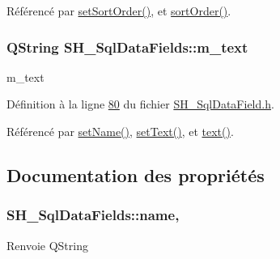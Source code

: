 Référencé par \hyperlink{classSH__SqlDataFields_a32a7c040a081d39594245e1a4a68f70d}{set\-Sort\-Order()}, et \hyperlink{classSH__SqlDataFields_af7ecc3a493545e81e6959d778352d9ac}{sort\-Order()}.

\hypertarget{classSH__SqlDataFields_a55352d3aea0863fcab26c948babe8523}{
\subsubsection[{m\-\_\-text}]{\setlength{\rightskip}{0pt plus 5cm}Q\-String S\-H\-\_\-\-Sql\-Data\-Fields\-::m\-\_\-text\hspace{0.3cm}{\ttfamily [private]}}}\label{classSH__SqlDataFields_a55352d3aea0863fcab26c948babe8523}


m\-\_\-text 



Définition à la ligne \hyperlink{SH__SqlDataField_8h_source_l00080}{80} du fichier \hyperlink{SH__SqlDataField_8h_source}{S\-H\-\_\-\-Sql\-Data\-Field.\-h}.



Référencé par \hyperlink{classSH__SqlDataFields_a8d7b864a4ad5513af9e4c47a0d9919e8}{set\-Name()}, \hyperlink{classSH__SqlDataFields_ae098408de73ecbd532de8f44dea2b6d0}{set\-Text()}, et \hyperlink{classSH__SqlDataFields_a7d8b3f434dc35ee83a9d8d9811e0e8eb}{text()}.



\subsection{Documentation des propriétés}
\hypertarget{classSH__SqlDataFields_ac7823e9c229edea389fc55ed73bf071b}{
\subsubsection[{name}]{\setlength{\rightskip}{0pt plus 5cm}S\-H\-\_\-\-Sql\-Data\-Fields\-::name\hspace{0.3cm}{\ttfamily [read]}, {\ttfamily [write]}}}\label{classSH__SqlDataFields_ac7823e9c229edea389fc55ed73bf071b}
\begin{DoxyReturn}{Renvoie}
Q\-String 
\end{DoxyReturn}


